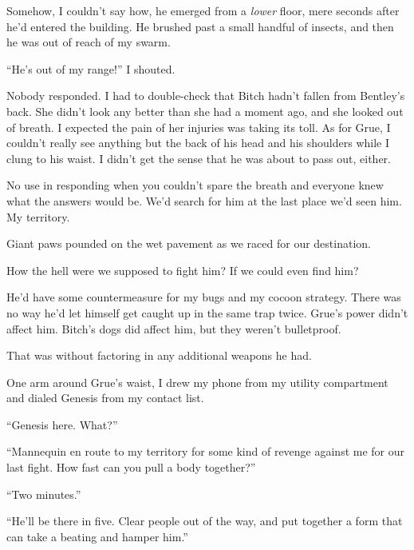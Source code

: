 Somehow, I couldn't say how, he emerged from a \emph{lower} floor, mere seconds after he'd entered the building.  He brushed past a small handful of insects, and then he was out of reach of my swarm.



``He's out of my range!'' I shouted.



Nobody responded.  I had to double-check that Bitch hadn't fallen from Bentley's back.  She didn't look any better than she had a moment ago, and she looked out of breath.  I expected the pain of her injuries was taking its toll.  As for Grue, I couldn't really see anything but the back of his head and his shoulders while I clung to his waist.  I didn't get the sense that he was about to pass out, either.



No use in responding when you couldn't spare the breath and everyone knew what the answers would be.  We'd search for him at the last place we'd seen him.  My territory.



Giant paws pounded on the wet pavement as we raced for our destination.



How the hell were we supposed to fight him?  If we could even find him?



He'd have some countermeasure for my bugs and my cocoon strategy.  There was no way he'd let himself get caught up in the same trap twice.  Grue's power didn't affect him.  Bitch's dogs did affect him, but they weren't bulletproof.



That was without factoring in any additional weapons he had.



One arm around Grue's waist, I drew my phone from my utility compartment and dialed Genesis from my contact list.



``Genesis here.  What?''



``Mannequin en route to my territory for some kind of revenge against me for our last fight.  How fast can you pull a body together?''



``Two minutes.''



``He'll be there in five.  Clear people out of the way, and put together a form that can take a beating and hamper him.''



